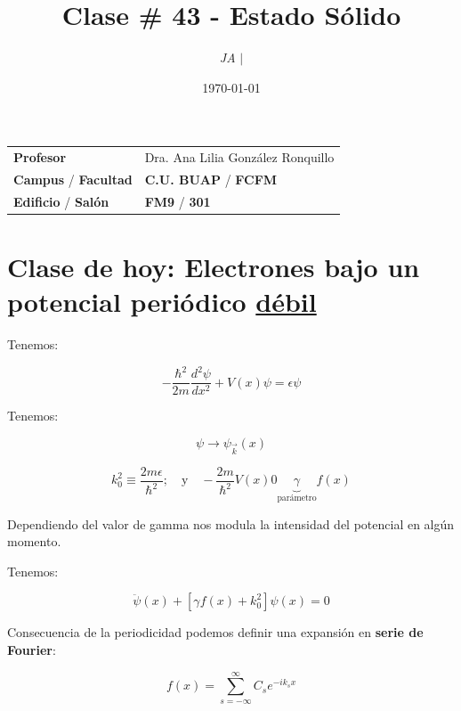 \documentclass{article}
\title{Clase \# 43 - Estado Sólido}
\author{\emph{JA} $\boldsymbol{\mid}$}
\date{\today}
\begin{document}
\maketitle



\begin{mybox}
\noindent\begin{tabular}{@{}ll}
	{\bfseries{Profesor}} & Dra. Ana Lilia González Ronquillo\\
	\textcolor{prussianblue}{\bfseries{Campus}} / \textcolor{trueblue}{\bfseries{Facultad}}  & \textcolor{prussianblue}{\bfseries{C.U. BUAP}} /  \textcolor{trueblue}{\bfseries{FCFM}} \\
	\textcolor{prussianblue}{\bfseries{Edificio}} /  \textcolor{trueblue}{\bfseries{Salón}}    & 	\textcolor{prussianblue}{\bfseries{FM9}} /  \textcolor{trueblue}{\bfseries{301}}   
\end{tabular} 
\end{mybox} \vspace{1cm}

\tableofcontents

\vspace{2cm}


\section{Clase de hoy: Electrones bajo un potencial periódico \underline{débil}}

Tenemos:

\[  - \frac{\hbar^{2}}{2m} \frac{d^{2}\psi}{dx^{2}} + V(x) \psi = \epsilon \psi  \]


Tenemos:

\[ \psi \to \psi_{\vec{k}}(x) \]

\[ k_{0}^{2} \equiv \frac{2m\epsilon}{\hbar^{2}}; \quad \text{y} \quad - \frac{2m}{\hbar^{2}} V(x) 0 \underbrace{\gamma}_{\text{parámetro}} f(x) \]

Dependiendo del valor de gamma nos modula la intensidad del potencial en algún momento. 

Tenemos: 

\[ \ddot{\psi}(x) + \left[ \gamma f(x)   + k_{0}^{2}\right] \psi(x) =0 \]


Consecuencia de la periodicidad podemos definir una expansión en \textbf{serie de Fourier}:


\[ f(x) = \sum\limits_{s=-\infty}^{\infty} C_{s} e^{-ik_{s}x} \]
\end{document}
